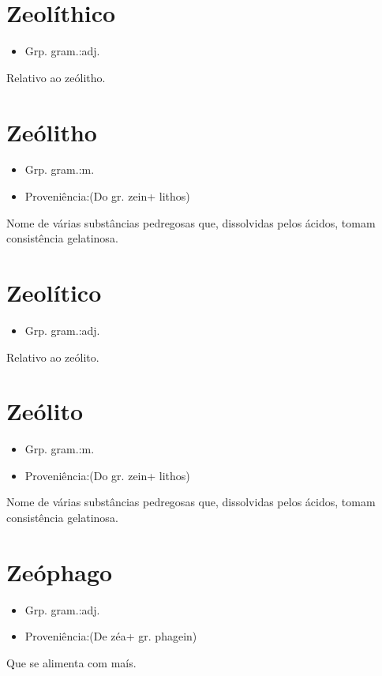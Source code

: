 \section{Zeolíthico}
\begin{itemize}
\item {Grp. gram.:adj.}
\end{itemize}
Relativo ao zeólitho.
\section{Zeólitho}
\begin{itemize}
\item {Grp. gram.:m.}
\end{itemize}
\begin{itemize}
\item {Proveniência:(Do gr. \textunderscore zein\textunderscore  + \textunderscore lithos\textunderscore )}
\end{itemize}
Nome de várias substâncias pedregosas que, dissolvidas pelos ácidos, tomam consistência gelatinosa.
\section{Zeolítico}
\begin{itemize}
\item {Grp. gram.:adj.}
\end{itemize}
Relativo ao zeólito.
\section{Zeólito}
\begin{itemize}
\item {Grp. gram.:m.}
\end{itemize}
\begin{itemize}
\item {Proveniência:(Do gr. \textunderscore zein\textunderscore  + \textunderscore lithos\textunderscore )}
\end{itemize}
Nome de várias substâncias pedregosas que, dissolvidas pelos ácidos, tomam consistência gelatinosa.
\section{Zeóphago}
\begin{itemize}
\item {Grp. gram.:adj.}
\end{itemize}
\begin{itemize}
\item {Proveniência:(De \textunderscore zéa\textunderscore  + gr. \textunderscore phagein\textunderscore )}
\end{itemize}
Que se alimenta com maís.
